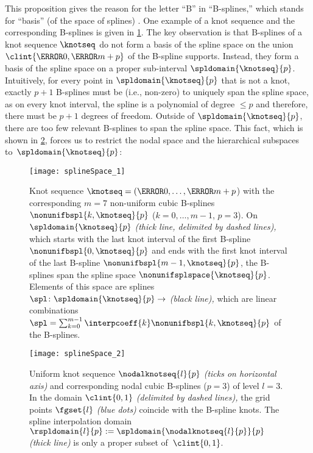 This proposition gives the reason for the letter ``B'' in ``B-splines,''
which stands for ``basis'' (of the space of splines) \cite{Schoenberg67Spline}.
One example of a knot sequence and the corresponding B-splines is
given in \cref{fig:splineSpaceGeneral}.
The key observation is that B-splines of a knot sequence $\knotseq$
do not form a basis of the spline space on the union
$\clint{\knot{0}, \knot{m+p}}$ of the B-spline supports.
Instead, they form a basis of the spline space
on a proper sub-interval $\spldomain{\knotseq}{p}$.
Intuitively, for every point in $\spldomain{\knotseq}{p}$ that is not a knot,
exactly $p + 1$ B-splines must be  (i.e., non-zero)
to uniquely span the spline space,
as on every knot interval, the spline is a polynomial of degree $\le p$
and therefore, there must be $p + 1$ degrees of freedom.
Outside of $\spldomain{\knotseq}{p}$, there are too few relevant B-splines
to span the spline space.
This fact,
which is shown in \cref{fig:splineSpaceUniform},
forces us to restrict the nodal space and the hierarchical subspaces
to~$\spldomain{\knotseq}{p}$:

\begin{figure}
  \texttt{[image: splineSpace\_1]}%
  \caption[%
    Non-uniform B-splines with knot sequence and interpolation domain%
  ]{%
    Knot sequence $\knotseq = (\knot{0}, \dotsc, \knot{m+p}$)
    with the corresponding $m = 7$ non-uniform cubic B-splines
    $\nonunifbspl{k,\knotseq}{p}$ ($k = 0, \dotsc, m - 1$, $p = 3$).
    On $\spldomain{\knotseq}{p}$ \emph{(thick line, delimited by dashed lines),}
    which starts with the last knot interval of the first B-spline
    $\nonunifbspl{0,\knotseq}{p}$
    and ends with the first knot interval of the last B-spline
    $\nonunifbspl{m-1,\knotseq}{p}$,
    the B-splines span the spline space $\nonunifsplspace{\knotseq}{p}$.
    Elements of this space are splines $\spl\colon \spldomain{\knotseq}{p} \to \real$
    \emph{(black line),}
    which are linear combinations
    $\spl = \sum_{k=0}^{m-1} \interpcoeff{k} \nonunifbspl{k,\knotseq}{p}$
    of the B-splines.%
  }%
  \label{fig:splineSpaceGeneral}%
\end{figure}

\begin{figure}
  \texttt{[image: splineSpace\_2]}%
  \caption[%
    Uniform nodal B-splines and knot sequence%
  ]{%
    Uniform knot sequence $\nodalknotseq{l}{p}$ \emph{(ticks on horizontal axis)}
    and corresponding nodal cubic B-splines ($p = 3$) of level $l = 3$.
    In the domain $\clint{0, 1}$ \emph{(delimited by dashed lines),}
    the grid points $\fgset{l}$ \emph{\textcolor{mittelblau}{(blue dots)}}
    coincide with the B-spline knots.
    The spline interpolation domain
    $\rspldomain{l}{p} := \spldomain{\nodalknotseq{l}{p}}{p}$
    \emph{(thick line)}
    is only a proper subset of~$\clint{0, 1}$.%
  }%
  \label{fig:splineSpaceUniform}%
\end{figure}

